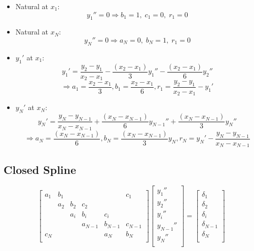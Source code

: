 \documentclass[aps,onecolumn,11pt]{revtex4}
\begin{document}
\begin{itemize}
\item Natural at $x_1$:
\begin{equation}
	y_1'' = 0 \Rightarrow  b_1=1,\;c_1=0,\;r_1=0
\end{equation}
\item Natural at $x_N$:
\begin{equation}
	y_N'' = 0 \Rightarrow a_N=0,\;b_N=1,\;r_1=0
\end{equation}

\item $y_1'$ at $x_1$:
\begin{equation}
	y_1' = \dfrac{y_2-y_1}{x_2-x_1} - \dfrac{(x_{2} - x_1)}{3} y_1'' - \dfrac{(x_{2} - x_1)}{6} y_{2}''
\end{equation}
$$
	\Rightarrow a_1=\dfrac{x_2-x_1}{3}, b_1=\dfrac{x_2-x_1}{6}, r_1 = \dfrac{y_2-y_1}{x_2-x_1} - y_1'
$$

\item $y_N'$ at $x_N$:
\begin{equation}
	y_N' = \dfrac{y_{N}-y_{N-1}}{x_{N}-x_{N-1}} + \dfrac{(x_{N} - x_{N-1})}{6} y_{N-1}'' + \dfrac{(x_{N} - x_{N-1})}{3} y_{N}''
\end{equation}
$$
	\Rightarrow a_N= \dfrac{(x_{N} - x_{N-1})}{6} , b_N = \dfrac{(x_{N} - x_{N-1})}{3} y_{N}, r_N = y_N' - \dfrac{y_{N}-y_{N-1}}{x_{N}-x_{N-1}}
$$
\end{itemize}

\subsection{Closed Spline}

	\begin{equation}
\begin{bmatrix}
a_1  & b_1 &     &         &         &  c_1    \\
     & a_2 & b_2 & c_2     &         &         \\
     &     & a_i & b_i     & c_i     &         \\
     &     &     & a_{N-1} & b_{N-1} & c_{N-1} \\
 c_N &     &     &         &   a_N   & b_N     \\
\end{bmatrix}
\begin{bmatrix}
	y_1''\\
	y_2''\\
	y_i''\\
	y_{N-1}''\\
	y_N''\\
\end{bmatrix}
 = 
 \begin{bmatrix}
 	\delta_1\\
	\delta_2\\
	\delta_i\\
	\delta_{N-1}\\
	\delta_N\\
 \end{bmatrix}
\end{equation}
	
\end{document}
